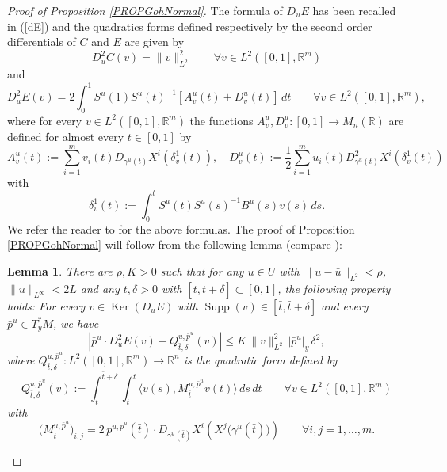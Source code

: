 \documentclass[JEP,XML,SOM,Unicode,NoFloatCountersInSection,published]{cedram}
\DeclareMathOperator{\Ker}{Ker}
\DeclareMathOperator{\Supp}{Supp}
\newcommand\R{\mathbb R}
\newtheorem{lemma}[theorem]{Lemma}
\theoremstyle{definition}
\begin{document}
\begin{proof}[Proof of Proposition \ref{PROPGohNormal}]
The formula of $D_uE$ has been recalled in (\ref{dE}) and the quadratics forms defined respectively by the second order differentials of $C$ and $E$ are given by
\begin{equation}\label{D2uC}
D_{u}^2C(v)= \|v\|_{L^2}^2 \qquad \forall v \in L^2([0,1],\R^m)
\end{equation}
and
\begin{equation}\label{d2uE}
D_{u}^2 E(v) = 2 \int_0^1 S^u(1) S^u(t)^{-1} \left[ A^u_v(t)+D^u_v(t)\right] \, dt \qquad \forall v \in L^2([0,1],\R^m),
\end{equation}
where for every $v\in L^2([0,1],\R^m)$ the functions $A^u_v, D^u_v:[0,1] \to M_n(\R)$ are defined for almost every $t\in [0,1]$ by
\begin{equation}\label{5avril6}
A^u_v(t) := \sum_{i=1}^m v_i(t) D_{\gamma^u(t)} X^i \left(\delta_v^1(t)\right), \quad D_v^u(t) := \frac{1}{2} \sum_{i=1}^m u_i(t) D^2 _{\gamma^u(t)} X^i \left(\delta_v^1(t)\right)
\end{equation}
with
\begin{equation}\label{5avril7}
\delta_v^1(t) := \int_0^t S^u(t) S^u(s)^{-1} B^u(s) v(s)\, ds.
\end{equation}
We refer the reader to \cite{riffordbook} for the above formulas. The proof of Proposition \ref{PROPGohNormal} will follow from the following lemma (compare \cite[Lem.\,2.21, p.\,63]{riffordbook}):

\begin{lemma}\label{LEM8sept}
There are $\rho, K>0$ such that for any $u\in U$ with $\|u-\bar{u}\|_{L^2}< \rho$, $\|u\|_{L^{\infty}}< 2L$ and any $\bar{t}, \delta>0$ with $[\bar{t},\bar{t}+\delta]\subset [0,1]$, the following property holds: For every $v\in \Ker (D_{u} E)$ with $\Supp (v)\in [\bar{t},\bar{t}+\delta]$ and every $\bar{p}^u\in T_y^*M$, we have
\begin{equation}\label{8sept3}
\left| \bar{p}^u \cdot D_{u}^2 E (v) - Q^{u,\bar{p}^u}_{\bar{t},\delta} (v) \right| \leq K \, \|v\|_{L^2}^2 \, \left|\bar{p}^u\right|_{y} \, \delta^2,
\end{equation}
where $Q^{u,\bar{p}^u}_{\bar{t},\delta}: L^2 \left([0,1],\R^m\right) \to \R^n$ is the quadratic form defined by
\begin{equation}\label{8septQ}
Q^{u,\bar{p}^u}_{\bar{t},\delta}(v) := \int_{\bar{t}}^{\bar{t}+\delta} \int_{\bar{t}}^t \langle v(s), M_{\bar{t}}^{u,\bar{p}^u}v(t)\rangle \, ds \, dt \qquad \forall v\in L^2 \left([0,1],\R^m\right)
\end{equation}
with
\begin{equation}\label{27avril1}
\bigl(M_{\bar{t}}^{u,\bar{p}^u}\bigr)_{i,j} = 2 \, p^{u,\bar{p}^u} (\bar{t}) \cdot D_{\gamma^u(\bar{t})} X^i \left(X^j\bigl(\gamma^u(\bar{t}) \bigr)\right) \qquad \forall i,j =1, \ldots,m.
\end{equation}
\end{lemma}


\end{proof}
\end{document}
